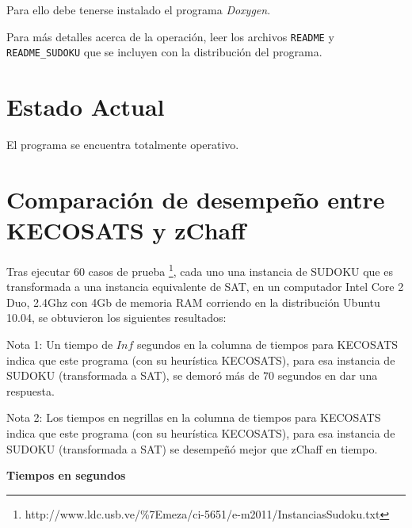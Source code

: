 \documentclass[12pt,lettersize,oneside]{article}
\begin{document}
Para ello debe tenerse instalado el programa \emph{Doxygen}.

Para más detalles acerca de la operación, leer los archivos {\tt README} y {\tt
  README\_SUDOKU} que se incluyen con la distribución del programa.
\section{Estado Actual}
El programa se encuentra totalmente operativo.

\section{Comparación de desempeño entre KECOSATS y zChaff}

Tras ejecutar $60$ casos de prueba
\footnote{http://www.ldc.usb.ve/\%7Emeza/ci-5651/e-m2011/InstanciasSudoku.txt},
cada uno una instancia de SUDOKU que es transformada a una instancia equivalente
de SAT, en un computador Intel Core 2 Duo, 2.4Ghz con 4Gb de memoria RAM
corriendo en la distribución Ubuntu 10.04, se
obtuvieron los siguientes resultados:

Nota 1: Un tiempo de $Inf$ segundos en la columna de tiempos para KECOSATS
indica que este programa (con su heurística KECOSATS), para esa instancia de
SUDOKU (transformada a SAT), se demoró más de $70$ segundos en dar una
respuesta.

Nota 2: Los tiempos en negrillas en la columna de tiempos para KECOSATS indica
que este programa (con su heurística KECOSATS), para esa instancia de SUDOKU
(transformada a SAT) se desempeñó mejor que zChaff en tiempo.

\begin{center}\textbf{ Tiempos en segundos}\end{center}\vspace{-2.5mm}

\end{document}
